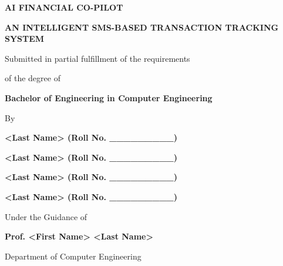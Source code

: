 \documentclass[11pt,a4paper]{report}
\begin{document}
\begin{titlepage}
    \centering
    \vspace*{1cm}
    
    {\LARGE\bfseries AI FINANCIAL CO-PILOT\par}
    {\large\bfseries AN INTELLIGENT SMS-BASED TRANSACTION TRACKING SYSTEM\par}
    
    \vspace{1.5cm}
    
    {\large Submitted in partial fulfillment of the requirements\par}
    {\large of the degree of\par}
    
    \vspace{0.5cm}
    
    {\Large\bfseries Bachelor of Engineering in Computer Engineering\par}
    
    \vspace{1.5cm}
    
    {\large By\par}
    \vspace{0.5cm}
    
    {\large\bfseries <First Name> <Last Name> (Roll No. \_\_\_\_\_\_\_\_\_)\par}
    {\large\bfseries <First Name> <Last Name> (Roll No. \_\_\_\_\_\_\_\_\_)\par}
    {\large\bfseries <First Name> <Last Name> (Roll No. \_\_\_\_\_\_\_\_\_)\par}
    {\large\bfseries <First Name> <Last Name> (Roll No. \_\_\_\_\_\_\_\_\_)\par}
    
    \vspace{1.5cm}
    
    {\large Under the Guidance of\par}
    \vspace{0.3cm}
    {\large\bfseries Prof. <First Name> <Last Name>\par}
    
    \vspace{1.5cm}
    
    {\large Department of Computer Engineering\par}
    
    \vspace{1cm}
    

\end{titlepage}
\end{document}
